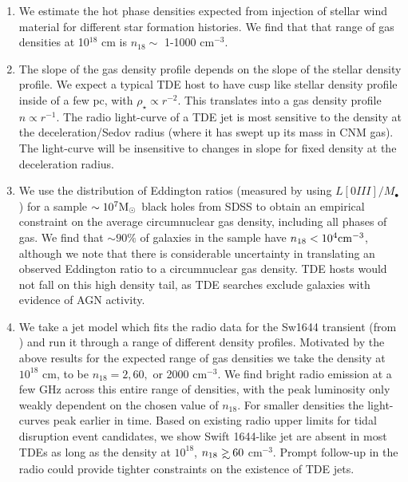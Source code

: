 \documentclass[usenatbib,fleqn]{mnras}
\newcommand\gsim{\mathrel{\rlap{\lower4pt\hbox{\hskip1pt$\sim$}}
    \raise1pt\hbox{$>$}}}
\newcommand{\Mbh}[1][]{M_{\bullet#1}}
\newcommand{\Msun}{{\rm M_\odot}}
\begin{document}
\begin{enumerate}
\item We estimate the hot phase densities expected from injection of
  stellar wind material for different star formation histories. We
  find that that range of gas densities at 10$^{18}$ cm is $n_{18}
  \sim$ 1-1000 cm$^{-3}$.

\item The slope of the gas density profile depends on the slope of the
  stellar density profile. We expect a typical TDE host to have cusp
  like stellar density profile inside of a few pc, with $\rho_\star
  \propto r^{-2}$. This translates into a gas density profile $n
  \propto r^{-1}$. The radio light-curve of a TDE jet is most
  sensitive to the density at the deceleration/Sedov radius (where it
  has swept up its mass in CNM gas). The light-curve will be
  insensitive to changes in slope for fixed density at the
  deceleration radius.

\item We use the distribution of Eddington ratios (measured by
  \citealt{Kauffmann&Heckman2009} using $L[0III]/\Mbh$) for a sample $\sim
  10^{7} \Msun$ black holes from SDSS to obtain an empirical
  constraint on the average circumnuclear gas density, including all
  phases of gas. We find that $\sim90\%$ of galaxies in the sample
  have $n_{18}<10^{4} {\rm cm}^{-3}$, although we note that there is
  considerable uncertainty in translating an observed Eddington ratio
  to a circumnuclear gas density. TDE hosts would not fall on this
  high density tail, as TDE searches exclude galaxies with evidence of
  AGN activity. 

\item We take a jet model which fits the radio data for the Sw1644
  transient (from \citealt{Mimica+2015}) and run it through a range of
  different density profiles. Motivated by the above results for the
  expected range of gas densities we take the density at $10^{18}$ cm,
  to be $n_{18}=2, 60,$ or 2000 cm$^{-3}$. We find bright radio
  emission at a few GHz across this entire range of densities, with
  the peak luminosity only weakly dependent on the chosen value of
  $n_{18}$.  For smaller densities the light-curves peak earlier in
  time. Based on existing radio upper limits for tidal disruption
  event candidates, we show Swift 1644-like jet are absent in most TDEs
  as long as the density at $10^{18}$, $n_{18} \gsim  60$
  cm$^{-3}$. Prompt follow-up in the radio could provide tighter
  constraints on the existence of TDE jets.  
\end{enumerate}
\end{document}
